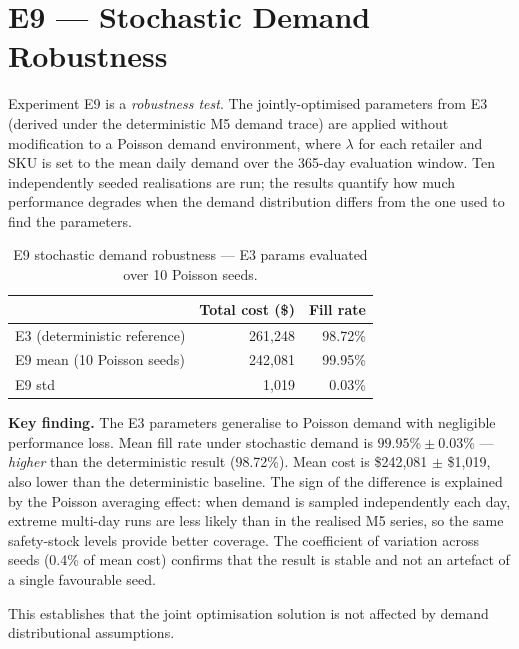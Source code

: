 \section{E9 --- Stochastic Demand Robustness}
\label{sec:results:e9}

Experiment E9 is a \emph{robustness test}.
The jointly-optimised parameters from E3 (derived
under the deterministic M5 demand trace) are applied without
modification to a Poisson demand environment, where $\lambda$ for each
retailer and SKU is set to the mean daily demand over the 365-day
evaluation window.  Ten independently seeded realisations are run; the
results quantify how much performance degrades when the demand
distribution differs from the one used to find the parameters.

\begin{table}[htbp]
  \centering
  \caption{E9 stochastic demand robustness — E3 params evaluated over 10 Poisson seeds.}
  \label{tab:e9}
  \begin{tabular}{@{}lrr@{}}
    \toprule
    & Total cost (\$) & Fill rate \\
    \midrule
    E3 (deterministic reference) & 261,248 & 98.72\% \\
    E9 mean (10 Poisson seeds)   & 242,081 & 99.95\% \\
    E9 std                       & \phantom{00}1,019 & 0.03\% \\
    \bottomrule
  \end{tabular}
\end{table}

\textbf{Key finding.}  The E3 parameters generalise to Poisson demand
with negligible performance loss.  Mean fill rate under stochastic
demand is $99.95\% \pm 0.03\%$ — \emph{higher} than the
deterministic result (98.72\%).  Mean cost is \$242,081 $\pm$ \$1,019,
also lower than the deterministic baseline.  The sign of the difference
is explained by the Poisson averaging effect: when demand is sampled
independently each day, extreme multi-day runs are less likely than in
the realised M5 series, so the same safety-stock levels provide better
coverage.  The coefficient of variation across seeds (0.4\% of mean
cost) confirms that the result is stable and not an artefact of a
single favourable seed.

This establishes that the joint optimisation solution is not
affected by demand distributional assumptions.  

